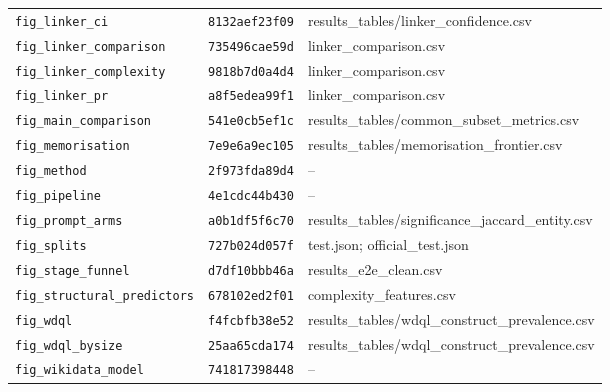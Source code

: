 \begin{longtable}{@{}>{\raggedright\arraybackslash}p{4.5cm} >{\raggedright\arraybackslash}p{2.5cm} >{\raggedright\arraybackslash}p{6.5cm}@{}}
\texttt{fig\_linker\_ci} & \texttt{8132aef23f09} & results\_tables/linker\_confidence.csv \\
\texttt{fig\_linker\_comparison} & \texttt{735496cae59d} & linker\_comparison.csv \\
\texttt{fig\_linker\_complexity} & \texttt{9818b7d0a4d4} & linker\_comparison.csv \\
\texttt{fig\_linker\_pr} & \texttt{a8f5edea99f1} & linker\_comparison.csv \\
\texttt{fig\_main\_comparison} & \texttt{541e0cb5ef1c} & results\_tables/common\_subset\_metrics.csv \\
\texttt{fig\_memorisation} & \texttt{7e9e6a9ec105} & results\_tables/memorisation\_frontier.csv \\
\texttt{fig\_method} & \texttt{2f973fda89d4} & -- \\
\texttt{fig\_pipeline} & \texttt{4e1cdc44b430} & -- \\
\texttt{fig\_prompt\_arms} & \texttt{a0b1df5f6c70} & results\_tables/significance\_jaccard\_entity.csv \\
\texttt{fig\_splits} & \texttt{727b024d057f} & test.json; official\_test.json \\
\texttt{fig\_stage\_funnel} & \texttt{d7df10bbb46a} & results\_e2e\_clean.csv \\
\texttt{fig\_structural\_predictors} & \texttt{678102ed2f01} & complexity\_features.csv \\
\texttt{fig\_wdql} & \texttt{f4fcbfb38e52} & results\_tables/wdql\_construct\_prevalence.csv \\
\texttt{fig\_wdql\_bysize} & \texttt{25aa65cda174} & results\_tables/wdql\_construct\_prevalence.csv \\
\texttt{fig\_wikidata\_model} & \texttt{741817398448} & -- \\
\end{longtable}
\fussy\normalsize

